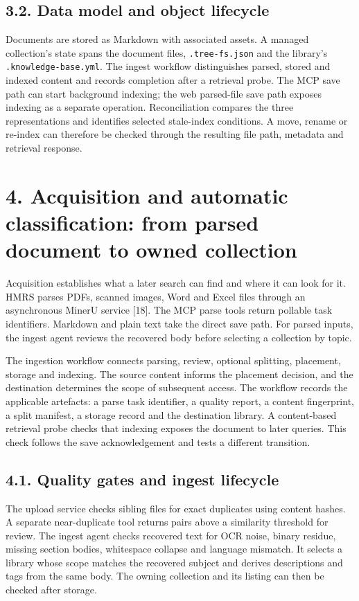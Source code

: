 \subsection{3.2. Data model and object lifecycle}



Documents are stored as Markdown with associated assets. A managed
collection's state spans the document files, \texttt{.tree-fs.json} and the
library's \texttt{.knowledge-base.yml}. The ingest workflow distinguishes
parsed, stored and indexed content and records completion after a retrieval
probe. The MCP save path can start background indexing; the web parsed-file
save path exposes indexing as a separate operation. Reconciliation compares
the three representations and identifies selected stale-index conditions.
A move, rename or re-index can therefore be checked through the resulting
file path, metadata and retrieval response.


\section{4. Acquisition and automatic classification: from parsed document to
owned collection}


Acquisition establishes what a later search can find and where it can
look for it. HMRS parses PDFs, scanned images, Word and Excel files through
an asynchronous MinerU service [18]. The MCP parse tools return
pollable task identifiers. Markdown and plain text take the direct save
path. For parsed inputs, the ingest agent reviews the recovered body before
selecting a collection by topic.

The ingestion workflow connects parsing, review, optional splitting,
placement, storage and indexing. The source content informs the placement
decision, and the destination determines the scope of subsequent access.
The workflow records the applicable artefacts: a parse task identifier,
a quality report, a content fingerprint, a split manifest, a storage
record and the destination library. A content-based retrieval probe checks
that indexing exposes the document to later queries. This check follows the
save acknowledgement and tests a different transition.

\subsection{4.1. Quality gates and ingest lifecycle}

The upload service checks sibling files for exact duplicates using content
hashes. A separate near-duplicate tool returns pairs above a similarity
threshold for review. The ingest agent checks recovered text for OCR noise,
binary residue, missing section bodies, whitespace collapse and language
mismatch. It selects a library whose scope matches the recovered subject and
derives descriptions and tags from the same body. The owning collection and
its listing can then be checked after storage.

